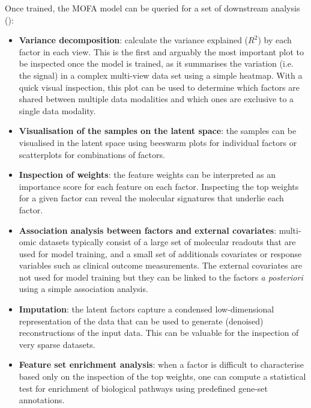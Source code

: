 Once trained, the MOFA model can be queried for a set of downstream analysis ():
\begin{itemize}
	\item \textbf{Variance decomposition}: calculate the variance explained ($R^2$) by each factor in each view. This is the first and arguably the most important plot to be inspected once the model is trained, as it summarises the variation (i.e. the signal) in a complex multi-view data set using a simple heatmap. With a quick visual inspection, this plot can be used to determine which factors are shared between multiple data modalities and which ones are exclusive to a single data modality.

	\item \textbf{Visualisation of the samples on the latent space}: the samples can be visualised in the latent space using beeswarm plots for individual factors or scatterplots for combinations of factors.

	\item \textbf{Inspection of weights}: the feature weights can be interpreted as an importance score for each feature on each factor. Inspecting the top weights for a given factor can reveal the molecular signatures that underlie each factor.

	\item \textbf{Association analysis between factors and external covariates}: multi-omic datasets typically consist of a large set of molecular readouts that are used for model training, and a small set of additionals covariates or response variables such as clinical outcome measurements. The external covariates are not used for model training but they can be linked to the factors \textit{a posteriori} using a simple association analysis.

	\item \textbf{Imputation}: the latent factors capture a condensed low-dimensional representation of the data that can be used to generate (denoised) reconstructions of the input data. This can be valuable for the inspection of very sparse datasets.

	\item \textbf{Feature set enrichment analysis}: when a factor is difficult to characterise based only on the inspection of the top weights, one can compute a statistical test for enrichment of biological pathways using predefined gene-set annotations.

\end{itemize}

